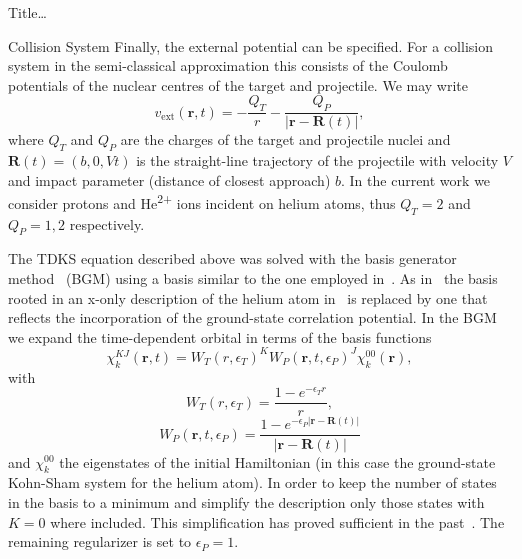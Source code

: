 \documentclass[letterpaper, 11 pt]{report}
\begin{document}
\begin{chapter}{ Title\dots \label{chap:p-he2p-he}}
\begin{section}{Collision System \label{sec:p-he2p-he-sys}}
      Finally, the external potential can be specified. For a collision system in the semi-classical
      approximation this consists of the Coulomb potentials of the nuclear centres of the target and
      projectile. We may write
      \begin{equation} \label{eq:phe2p-ext}
         v_\mathrm{ext}(\mathbf{r},t) = -\frac{Q_T}{r} 
         - \frac{Q_P}{\left| \mathbf{r} - \mathbf{R}(t) \right|},
      \end{equation}
      where $Q_T$ and $Q_P$ are the charges of the target and projectile nuclei and
      $\mathbf{R}(t) = (b,0,V t)$ is the straight-line trajectory of the projectile with velocity $V$ and
      impact parameter (distance of closest approach) $b$. In the current work we consider protons and
      He\textsuperscript{2+} ions incident on helium atoms, thus $Q_T = 2$ and $Q_P = 1,2$ respectively.

      The TDKS equation described above was solved with the basis generator method~\cite{bgm} (BGM)
      using a basis similar to the one employed in~\cite{keim-ihe}. As in~\cite{pbarhe} the basis rooted
      in an x-only description of the helium atom in~\cite{keim-ihe} is replaced by one that reflects the
      incorporation of the ground-state correlation potential. In the BGM we expand the time-dependent
      orbital in terms of the basis functions
      \begin{equation}
         \chi^{KJ}_k (\mathbf{r},t)
         = W_T(r,\epsilon_T)^K W_P( \mathbf{r},t, \epsilon_P)^J \chi^{00}_k (\mathbf{r}),
      \end{equation}
      with
      \begin{equation}
         W_T(r,\epsilon_T) = \frac{1 - e^{-\epsilon_T r}}{r},
      \end{equation}
      \begin{equation}
         W_P (\mathbf{r},t,\epsilon_P)
         = \frac{1 - e^{-\epsilon_P|\mathbf{r} - \mathbf{R}(t)|}}{|\mathbf{r} - \mathbf{R}(t)|}
      \end{equation}
      and $\chi^{00}_k$ the eigenstates of the initial Hamiltonian (in this case the ground-state
      Kohn-Sham system for the helium atom). In order to keep the number of states in the basis to a
      minimum and simplify the description only those states with $K = 0$ where included. This
      simplification has proved sufficient in the past~\cite{bgm-rev}. The remaining regularizer is set
      to $\epsilon_P = 1$.


\end{section}
\end{chapter}
\end{document}
